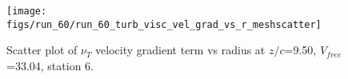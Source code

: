 \begin{figure}[H]
\centering
\texttt{[image: figs/run\_60/run\_60\_turb\_visc\_vel\_grad\_vs\_r\_meshscatter]}
\caption{Scatter plot of $\nu_T$ velocity gradient term vs radius at $z/c$=9.50, $V_{free}$=33.04, station 6.}
\label{fig:run_60_turb_visc_vel_grad_vs_r_meshscatter}
\end{figure}


